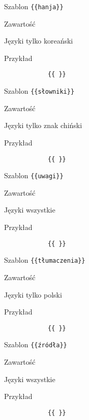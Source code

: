 \documentclass{pracamgr}
\begin{document}
\spacer
\begin{description-sub}
	\item[Szablon] \verb|{{hanja}}|
	\item[Zawartość]
	\item[Języki] tylko koreański
	\item[Przykład]
		\begin{verbatim}
			{{ }}
		\end{verbatim}
\end{description-sub}
\spacer
\begin{description-sub}
	\item[Szablon] \verb|{{słowniki}}|
	\item[Zawartość]
	\item[Języki] tylko znak chiński
	\item[Przykład]
		\begin{verbatim}
			{{ }}
		\end{verbatim}
\end{description-sub}
\spacer
\begin{description-sub}
	\item[Szablon] \verb|{{uwagi}}|
	\item[Zawartość]
	\item[Języki] wszystkie
	\item[Przykład]
		\begin{verbatim}
			{{ }}
		\end{verbatim}
\end{description-sub}
\spacer
\begin{description-sub}
	\item[Szablon] \verb|{{tłumaczenia}}|
	\item[Zawartość]
	\item[Języki] tylko polski
	\item[Przykład]
		\begin{verbatim}
			{{ }}
		\end{verbatim}
\end{description-sub}
\spacer
\begin{description-sub}
	\item[Szablon] \verb|{{źródła}}|
	\item[Zawartość]
	\item[Języki] wszystkie
	\item[Przykład]
		\begin{verbatim}
			{{ }}
		\end{verbatim}
\end{description-sub}
\spacer
\end{document}
